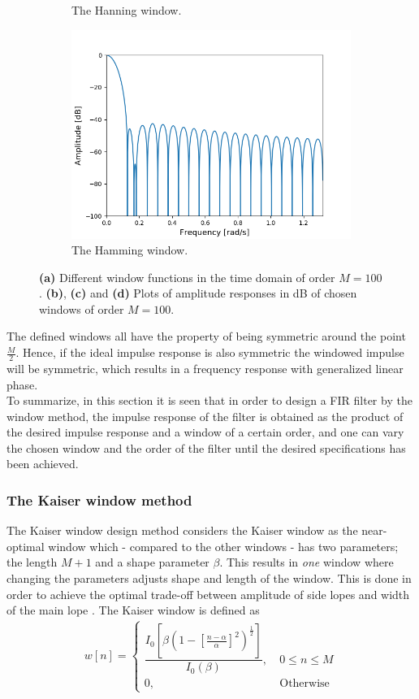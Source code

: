 \begin{figure}[H]
\begin{subfigure}{0.49\textwidth}
\caption{The Hanning window.}
\label{fig:hann_db}
\includegraphics[width=\textwidth]{figures/dbplots/hamming.png}
\caption{The Hamming window.}
\label{fig:hamming_db}
\end{subfigure}
\caption{\textbf{(a)} Different window functions in the time domain of order $M=100$. \textbf{(b)}, \textbf{(c)} and \textbf{(d)} Plots of amplitude responses in dB of chosen windows of order $M=100$.}
\label{fig:windows}
\end{figure}

The defined windows all have the property of being symmetric around the point $\frac{M}{2}$. Hence, if the ideal impulse response is also symmetric the windowed impulse will be symmetric, which results in a frequency response with generalized linear phase. \\
To summarize, in this section it is seen that in order to design a FIR filter by the window method, the impulse response of the filter is obtained as the product of the desired impulse response and a window of a certain order, and one can vary the chosen window and the order of the filter until the desired specifications has been achieved.

\subsubsection{The Kaiser window method}
The Kaiser window design method considers the Kaiser window as the near-optimal window which - compared to the other windows - has two parameters; the length $M+1$ and a shape parameter $\beta$. This results in \textit{one} window where changing the parameters adjusts shape and length of the window. This is done in order to achieve the optimal trade-off between amplitude of side lopes and width of the main lope \cite{page 566, DTSP}. The Kaiser window is defined as
\begin{align}
w[n]=\left\{\begin{matrix}
 \dfrac{I_0[\beta (1-[\frac{n-\alpha}{\alpha}]^2)^{\frac{1}{2}}]}{I_0(\beta)} , &\ 0 \leq n \leq M  \\ 
0, &\ \text{Otherwise}
\end{matrix}\right.
\end{align}

